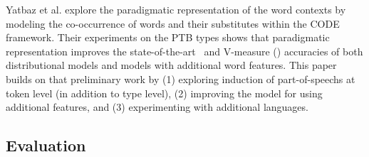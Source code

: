Yatbaz et al.  explore
the paradigmatic representation of the word contexts by modeling the
co-occurrence of words and their substitutes within the CODE
framework.  Their experiments on the PTB types shows that paradigmatic
representation improves the state-of-the-art \mto\ and V-measure (\vm)
accuracies of both distributional models and models with additional
word features.  This paper builds on that preliminary work by
(1) exploring induction of part-of-speechs at token level (in addition
to type level), (2) improving the model for using additional features,
and (3) experimenting with additional languages.



\subsection{Evaluation}

